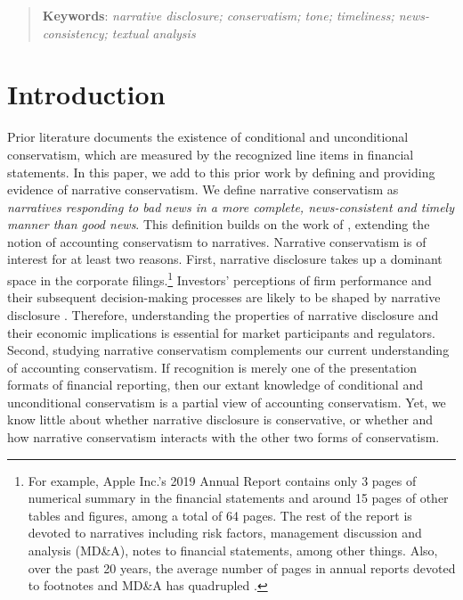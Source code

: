 \documentclass[a4paper]{article}
\begin{document}
\begin{spacing}{2}
\begin{abstract}
\begin{normalsize}
	\noindent
	\textbf{Keywords}: \textit{narrative disclosure; conservatism; tone; timeliness; news-consistency; textual analysis}
	\end{normalsize}
\end{abstract}

\clearpage

\setcounter{page}{1}
\section{Introduction}
Prior literature documents the existence of conditional and unconditional conservatism, which are measured by the recognized line items in financial statements. %
In this paper, we add to this prior work by defining and providing evidence of narrative conservatism. We define narrative conservatism as \textit{narratives responding to bad news in a more complete, news-consistent and timely manner than good news}. This definition builds on the work of , extending the notion of accounting conservatism to narratives. Narrative conservatism is of interest for at least two reasons. First, narrative disclosure takes up a dominant space in the corporate filings.\footnote{For example, Apple Inc.'s 2019 Annual Report contains only 3 pages of numerical summary in the financial statements and around 15 pages of other tables and figures, among a total of 64 pages. The rest of the report is devoted to narratives including risk factors, management discussion and analysis (MD\&A), notes to financial statements, among other things. Also, over the past 20 years, the average number of pages in annual reports devoted to footnotes and MD\&A has quadrupled \cite{eyPointNowTime2012}.} Investors' perceptions of firm performance and their subsequent decision-making processes are likely to be shaped by narrative disclosure . Therefore, understanding the properties of narrative disclosure and their economic implications is essential for market participants and regulators. Second, studying narrative conservatism complements our current understanding of accounting conservatism. If recognition is merely one of the presentation formats of financial reporting, then our extant knowledge of conditional and unconditional conservatism is a partial view of accounting conservatism. Yet, we know little about whether narrative disclosure is conservative, or whether and how narrative conservatism interacts with the other two forms of conservatism.


\end{spacing}
\end{document}
